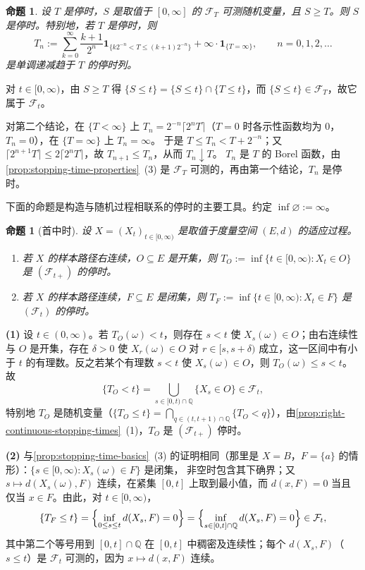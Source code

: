 \documentclass[UTF8,11pt,a4paper,oneside,fontset=fandol]{ctexrep}
\makeatletter
\numberwithin{equation}{section}
\theoremstyle{zhthm}
\newtheorem{proposition}[theorem]{命题}
\renewenvironment{proof}[1][\proofname]{\par
  \pushQED{\qed}%
  \normalfont\topsep6\p@\@plus6\p@\relax
  \trivlist
  \item[\hskip\labelsep\bfseries#1\hspace{0.5em}]\ignorespaces
}{%
  \popQED\endtrivlist\@endpefalse
}
\renewcommand{\proofname}{证明}
\newcommand{\Q}{\mathbb{Q}}
\newcommand{\F}{\mathcal{F}}
\newcommand{\ind}[1]{\mathbf{1}_{#1}}
\makeatother
\begin{document}
\begin{proposition}
\label{prop:stopping-time-dyadic-approximation}
设 $T$ 是停时，$S$ 是取值于 $[0,\infty]$ 的 $\F_T$ 可测随机变量，且 $S\ge T$。则 $S$ 是停时。特别地，若 $T$ 是停时，则
\[
  T_n:=\sum_{k=0}^{\infty}\frac{k+1}{2^n}\ind{\{k2^{-n}<T\le(k+1)2^{-n}\}}+\infty\cdot\ind{\{T=\infty\}},\qquad n=0,1,2,\ldots
\]
是单调递减趋于 $T$ 的停时列。
\end{proposition}

\begin{proof}
对 $t\in[0,\infty)$，由 $S\ge T$ 得 $\{S\le t\}=\{S\le t\}\cap\{T\le t\}$，而 $\{S\le t\}\in\F_T$，故它属于 $\F_t$。

对第二个结论，在 $\{T<\infty\}$ 上 $T_n=2^{-n}\lceil2^nT\rceil$（$T=0$ 时各示性函数均为 $0$，$T_n=0$），在 $\{T=\infty\}$ 上 $T_n=\infty$。
于是 $T\le T_n<T+2^{-n}$；又 $\lceil2^{n+1}T\rceil\le2\lceil2^nT\rceil$，故 $T_{n+1}\le T_n$，从而 $T_n\downarrow T$。
$T_n$ 是 $T$ 的 Borel 函数，由\cref{prop:stopping-time-properties}~(3) 是 $\F_T$ 可测的，再由第一个结论，$T_n$ 是停时。
\end{proof}

下面的命题是构造与随机过程相联系的停时的主要工具。约定 $\inf\varnothing:=\infty$。

\begin{proposition}[首中时]
\label{prop:hitting-times-stopping}
设 $X=(X_t)_{t\in[0,\infty)}$ 是取值于度量空间 $(E,d)$ 的适应过程。
\begin{enumerate}[label=(\arabic*)]
  \item 若 $X$ 的样本路径右连续，$O\subseteq E$ 是开集，则 $T_O:=\inf\{t\in[0,\infty):X_t\in O\}$ 是 $(\F_{t+})$ 的停时。
  \item 若 $X$ 的样本路径连续，$F\subseteq E$ 是闭集，则 $T_F:=\inf\{t\in[0,\infty):X_t\in F\}$ 是 $(\F_t)$ 的停时。
\end{enumerate}
\end{proposition}

\begin{proof}
\textbf{(1)} 设 $t\in(0,\infty)$。若 $T_O(\omega)<t$，则存在 $s<t$ 使 $X_s(\omega)\in O$；由右连续性与 $O$ 是开集，存在 $\delta>0$ 使
$X_r(\omega)\in O$ 对 $r\in[s,s+\delta)$ 成立，这一区间中有小于 $t$ 的有理数。反之若某个有理数 $s<t$ 使 $X_s(\omega)\in O$，则 $T_O(\omega)\le s<t$。故
\[
  \{T_O<t\}=\bigcup_{s\in[0,t)\cap\Q}\{X_s\in O\}\in\F_t,
\]
特别地 $T_O$ 是随机变量（$\{T_O\le t\}=\bigcap_{q\in(t,t+1)\cap\Q}\{T_O<q\}$），由\cref{prop:right-continuous-stopping-times}~(1)，$T_O$ 是 $(\F_{t+})$ 停时。

\textbf{(2)} 与\cref{prop:stopping-time-basics}~(3) 的证明相同（那里是 $X=B$，$F=\{a\}$ 的情形）：$\{s\in[0,\infty):X_s(\omega)\in F\}$ 是闭集，
非空时包含其下确界；又 $s\mapsto d(X_s(\omega),F)$ 连续，在紧集 $[0,t]$ 上取到最小值，而 $d(x,F)=0$ 当且仅当 $x\in F$。由此，对 $t\in[0,\infty)$，
\[
  \{T_F\le t\}=\Bigl\{\inf_{0\le s\le t}d(X_s,F)=0\Bigr\}=\Bigl\{\inf_{s\in[0,t]\cap\Q}d(X_s,F)=0\Bigr\}\in\F_t,
\]
其中第二个等号用到 $[0,t]\cap\Q$ 在 $[0,t]$ 中稠密及连续性；每个 $d(X_s,F)$（$s\le t$）是 $\F_t$ 可测的，因为 $x\mapsto d(x,F)$ 连续。
\end{proof}
\end{document}
